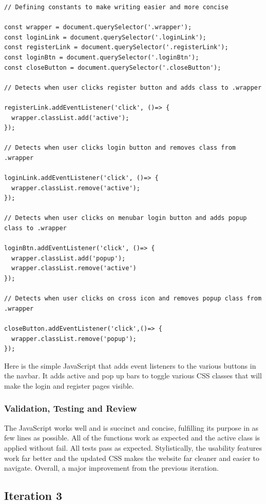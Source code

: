 \documentclass{article}
\begin{document}
\begin{lstlisting}[caption={app.js}]
  // Defining constants to make writing easier and more concise

const wrapper = document.querySelector('.wrapper');
const loginLink = document.querySelector('.loginLink');
const registerLink = document.querySelector('.registerLink');
const loginBtn = document.querySelector('.loginBtn');
const closeButton = document.querySelector('.closeButton');

// Detects when user clicks register button and adds class to .wrapper 

registerLink.addEventListener('click', ()=> {
  wrapper.classList.add('active');
});

// Detects when user clicks login button and removes class from .wrapper

loginLink.addEventListener('click', ()=> {
  wrapper.classList.remove('active');
});

// Detects when user clicks on menubar login button and adds popup class to .wrapper

loginBtn.addEventListener('click', ()=> {
  wrapper.classList.add('popup');
  wrapper.classList.remove('active')
});

// Detects when user clicks on cross icon and removes popup class from .wrapper

closeButton.addEventListener('click',()=> {
  wrapper.classList.remove('popup');
});
\end{lstlisting}

Here is the simple JavaScript that adds event listeners to the various buttons in the navbar. It adds active and pop up bars to toggle various CSS classes that will make the login and register pages visible.

\subsubsection{Validation, Testing and Review}

The JavaScript works well and is succinct and concise, fulfilling its purpose in as few lines as possible. All of the functions work as expected and the active class is applied without fail. All tests pass as expected. Stylistically, the usability features work far better and the updated CSS makes the website far cleaner and easier to navigate. Overall, a major improvement from the previous iteration. 

\subsection{Iteration 3}
\end{document}
